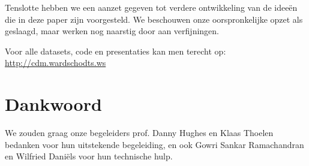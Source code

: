 \documentclass[11pt]{article}
\begin{document}
Tenslotte hebben we een aanzet gegeven tot verdere ontwikkeling van de idee\"en
die in deze paper zijn voorgesteld. We beschouwen onze oorspronkelijke opzet als
geslaagd, maar werken nog naarstig door aan verfijningen.

Voor alle datasets, code en presentaties kan men terecht op:
\url{http://cdm.wardschodts.ws}

\section{Dankwoord}

We zouden graag onze begeleiders prof. Danny Hughes en Klaas Thoelen bedanken
voor hun uitstekende begeleiding, en ook Gowri Sankar Ramachandran en Wilfried
Dani\"els voor hun technische hulp.



\nocite{*}

\end{document}
